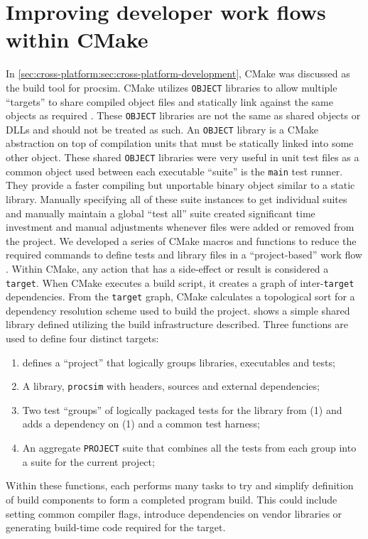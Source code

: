 \section{Improving developer work flows within CMake}
\label{sec:cross-platform:sec:cmake-flows}

In \cref{sec:cross-platform:sec:cross-platform-development}, CMake was discussed as the build tool for procsim. CMake utilizes \texttt{OBJECT} libraries to allow multiple ``targets'' to share compiled object files and statically link against the same objects as required \cite{CMake:add_library}. These \texttt{OBJECT} libraries are not the same as shared objects or DLLs and should not be treated as such. An \texttt{OBJECT} library is a CMake abstraction on top of compilation units that must be statically linked into some other object. These shared \texttt{OBJECT} libraries were very useful in unit test files as a common object used between each executable ``suite'' is the \texttt{main} test runner. They provide a faster compiling but unportable binary object similar to a static library. Manually specifying all of these suite instances to get individual suites and manually maintain a global ``test all'' suite created significant time investment and manual adjustments whenever files were added or removed from the project. We developed a series of CMake macros and functions to reduce the required commands to define tests and library files in a ``project-based'' work flow \cite{CMake:macro, CMake:function}. Within CMake, any action that has a side-effect or result is considered a \texttt{target}. When CMake executes a build script, it creates a graph of inter-\texttt{target} dependencies. From the \texttt{target} graph, CMake calculates a topological sort for a dependency resolution scheme used to build the project.  shows a simple shared library defined utilizing the build infrastructure described. Three functions are used to define four distinct targets: 
\begin{enumerate}
    \item {} defines a ``project'' that logically groups libraries, executables and tests;
    \item A library, \texttt{procsim} with headers, sources and external dependencies;
    \item Two test ``groups'' of logically packaged tests for the library from (1) and adds a dependency on (1) and a common test harness;
    \item An aggregate \texttt{PROJECT} suite that combines all the tests from each group into a suite for the current project;
\end{enumerate}
Within these functions, each performs many tasks to try and simplify definition of build components to form a completed program build. This could include setting common compiler flags, introduce dependencies on vendor libraries or generating build-time code required for the target. 

